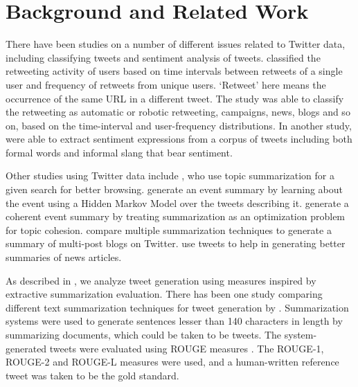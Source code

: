 \section{Background and Related Work}
\label{sec:background}

There have been studies on a number of different issues related to Twitter data, including classifying tweets and sentiment analysis of tweets.  classified the retweeting activity of users based on time intervals between retweets of a single user and frequency of retweets from unique users. `Retweet' here means the occurrence of the same URL in a different tweet. The study was able to classify the retweeting as automatic or robotic retweeting, campaigns, news, blogs and so on, based on the time-interval and user-frequency distributions. In another study,  were able to extract sentiment expressions from a corpus of tweets including both formal words and informal slang that bear sentiment.

Other studies using Twitter data include , who use topic summarization for a given search for better browsing.  generate an event summary by learning about the event using a Hidden Markov Model over the tweets describing it.  generate a coherent event summary by treating summarization as an optimization problem for topic cohesion.  compare multiple summarization techniques to generate a summary of multi-post blogs on Twitter.  use tweets to help in generating better summaries of news articles.

As described in , we analyze tweet generation using measures inspired by extractive summarization evaluation. There has been one study comparing different text summarization techniques for tweet generation by . Summarization systems were used to generate sentences lesser than 140 characters in length by summarizing documents, which could be taken to be tweets. The system-generated tweets were evaluated using ROUGE measures \cite{lin2004rouge}. The ROUGE-1, ROUGE-2 and ROUGE-L measures were used, and a human-written reference tweet was taken to be the gold standard. %

